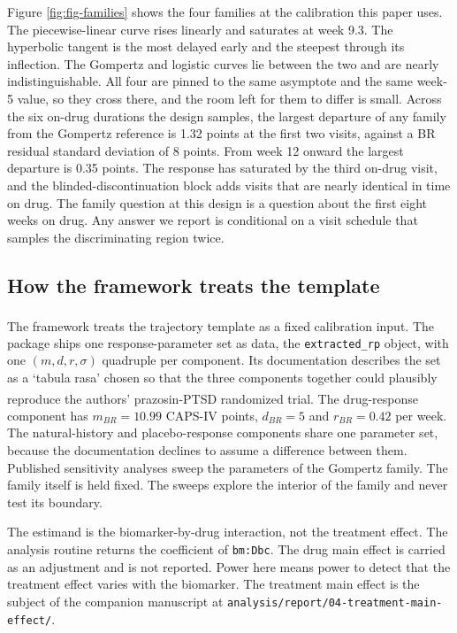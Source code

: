 \documentclass[
  11pt,
]{article}
\begin{document}
Figure \ref{fig:fig-families} shows the four families at the
calibration this paper uses. The piecewise-linear curve rises
linearly and saturates at week
9.3. The hyperbolic
tangent is the most delayed early and the steepest through its
inflection. The Gompertz and logistic curves lie between the two and
are nearly indistinguishable. All four are pinned to the same
asymptote and the same week-5 value, so they cross there, and the room
left for them to differ is small. Across the six on-drug durations the
design samples, the largest departure of any family from the Gompertz
reference is 1.32
points at the first two visits, against a BR residual standard
deviation of 8 points. From week 12 onward the largest
departure is 0.35
points. The response has saturated by the third on-drug visit, and the
blinded-discontinuation block adds visits that are nearly identical in
time on drug. The family question at this design is a question about
the first eight weeks on drug. Any answer we report is conditional on
a visit schedule that samples the discriminating region twice.

\subsection{How the framework treats the template}\label{how-the-framework-treats-the-template}

The framework treats the trajectory template as a fixed calibration
input\textsuperscript{}. The package ships one response-parameter set
as data, the \texttt{extracted\_rp} object, with one \((m, d, r, \sigma)\)
quadruple per component. Its documentation describes the set as a
`tabula rasa' chosen so that the three components together could
plausibly reproduce the authors' prazosin-PTSD randomized trial\textsuperscript{}. The drug-response component has
\(m_{BR} = 10.99\) CAPS-IV points,
\(d_{BR} = 5\) and \(r_{BR} = 0.42\) per week. The
natural-history and placebo-response components share one parameter
set, because the documentation declines to assume a difference between
them. Published sensitivity analyses sweep the parameters of the
Gompertz family. The family itself is held fixed. The sweeps explore
the interior of the family and never test its boundary.

The estimand is the biomarker-by-drug interaction, not the treatment
effect. The analysis routine returns the coefficient of
\texttt{bm:Dbc}. The drug main effect is carried as an adjustment and is not
reported. Power here means power to detect that the treatment effect
varies with the biomarker. The treatment main effect is the subject of
the companion manuscript at
\texttt{analysis/report/04-treatment-main-effect/}.
\end{document}
